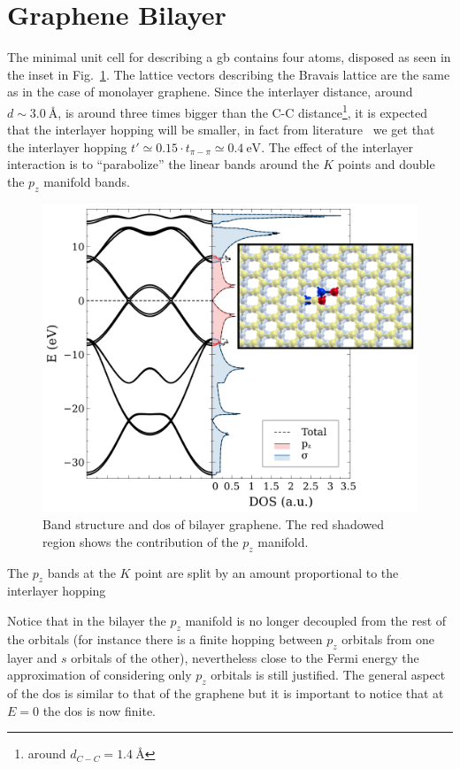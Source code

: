 \section{Graphene Bilayer}
The minimal unit cell for describing a \ac{gb} contains four atoms, disposed as seen in the inset in Fig.~\ref{bilayer}. The lattice vectors describing the Bravais lattice are the same as in the case of monolayer graphene. Since the interlayer distance, around $d \sim \SI{3.0}{\angstrom}$, is  around three times bigger than the C-C distance\footnote{around $d_{C-C} = \SI{1.4}{\angstrom}$}, it is expected that the interlayer hopping will be smaller, in fact from literature~\cite{KatsnelsonBook} we get that the interlayer hopping $t'\simeq 0.15\cdot t_{\pi-\pi}\simeq\SI{0.4}{\eV}$. The effect of the interlayer interaction is to ``parabolize'' the linear bands around the $K$ points and double the $p_z$ manifold bands.
\begin{figure}[h!]
\centering
\includegraphics{chapter06/figures/bilayer_bandDOS.pdf}
\vspace{-5pt}
\caption{Band structure and \ac{dos} of bilayer graphene. The red shadowed region shows the contribution of the $p_z$ manifold.}
\label{bilayer}
\end{figure}
\FloatBarrier
The $p_z$ bands at the $K$ point are split by an amount proportional to the interlayer hopping

Notice that in the bilayer the $p_z$ manifold is no longer decoupled from the rest of the orbitals (for instance there is a finite hopping between $p_z$ orbitals from one layer and $s$ orbitals of the other), nevertheless close to the Fermi energy the approximation of considering only $p_z$ orbitals is still justified.
The general aspect of the \ac{dos} is similar to that of the graphene but it is important to notice that at $E=0$ the \ac{dos} is now finite.

